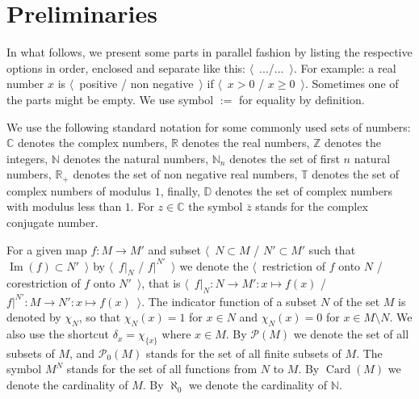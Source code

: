 
\chapter{Preliminaries} %

\label{ChapterPreliminaries} %


In what follows, we present some parts in parallel fashion by listing the respective options in order, enclosed and separate like this: $\langle$~.../...~$\rangle$. For example: a real number $x$ is $\langle$~positive / non negative~$\rangle$ if $\langle$~$x>0$ / $x\geq 0$~$\rangle$. Sometimes one of the parts might be empty. We use symbol $:=$ for equality by definition.

We use the following standard notation for some commonly used sets of numbers: $\mathbb{C}$ denotes the complex numbers, $\mathbb{R}$ denotes the real numbers, $\mathbb{Z}$ denotes the integers, $\mathbb{N}$ denotes the natural numbers, $\mathbb{N}_n$ denotes the set of first $n$ natural numbers, $\mathbb{R}_+$ denotes the set of non negative real numbers, $\mathbb{T}$ denotes the set of complex numbers of modulus $1$, finally, $\mathbb{D}$ denotes the set of complex numbers with modulus less than $1$. For $z\in\mathbb{C}$ the symbol $\overline{z}$ stands for the complex conjugate number.

For a given map $f:M\to M'$ and subset $\langle$~$N\subset M$ / $N'\subset M'$ such that $\operatorname{Im}(f)\subset N'$~$\rangle$ by $\langle$~$f|_N$ / $f|^{N'}$~$\rangle$ we denote the  $\langle$~restriction of $f$ onto $N$ / corestriction of $f$ onto $N'$~$\rangle$, that is $\langle$~$f|_N:N\to M':x\mapsto f(x)$ / $f|^{N'}:M\to N':x\mapsto f(x)$~$\rangle$. The indicator function of a subset $N$ of the set $M$ is denoted by $\chi_{N}$, so that $\chi_N(x)=1$ for $x\in N$ and $\chi_N(x)=0$ for $x\in M\setminus N$. We also use the shortcut $\delta_x=\chi_{\{x\}}$ where $x\in M$. By $\mathcal{P}(M)$ we denote the set of all subsets of $M$, and $\mathcal{P}_0(M)$ stands for the set of all finite subsets of $M$. The symbol $M^N$ stands for the set of all functions from $N$ to $M$. By $\operatorname{Card}(M)$ we denote the cardinality of $M$. By $\aleph_0$ we denote the cardinality of $\mathbb{N}$.

